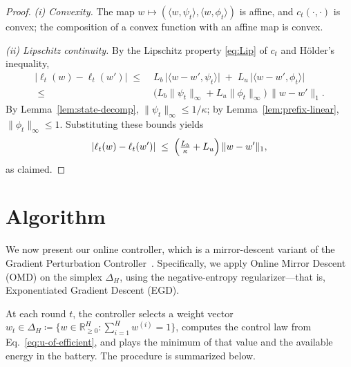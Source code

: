 \begin{proof}
\emph{(i) Convexity.}
The map \(w \mapsto (\langle w,\psi_t\rangle,\langle w,\phi_t\rangle)\) is affine, and \(c_t(\cdot,\cdot)\) is convex; the composition of a convex function with an affine map is convex.

\emph{(ii) Lipschitz continuity.}
By the Lipschitz property \eqref{eq:Lip} of \(c_t\) and Hölder’s inequality,
\begin{align*}
|\ell_t(w)-\ell_t(w')|
\;\le\;&
L_b\,\big|\langle w-w',\psi_t\rangle\big|
\;+\;
L_u\,\big|\langle w-w',\phi_t\rangle\big|
\\\;\le\;&
\bigl(L_b\|\psi_t\|_\infty + L_u\|\phi_t\|_\infty\bigr)\,\|w-w'\|_1.
\end{align*}
By Lemma~\ref{lem:state-decomp}, \(\|\psi_t\|_\infty \le 1/\kappa\); by Lemma~\ref{lem:prefix-linear}, \(\|\phi_t\|_\infty \le 1\). Substituting these bounds yields
\[
|\ell_t(w)-\ell_t(w')|
\;\le\;
\Bigl(\tfrac{L_b}{\kappa} + L_u\Bigr)\,\|w-w'\|_1,
\]
as claimed.
\end{proof}


\section{Algorithm}

We now present our online controller, which is a mirror-descent variant of the Gradient Perturbation Controller~\cite{hazan_introduction_2025}.  
Specifically, we apply Online Mirror Descent (OMD) on the simplex \(\Delta_H\), using the negative-entropy regularizer—that is, Exponentiated Gradient Descent (EGD).

At each round \(t\), the controller selects a weight vector \(w_t \in \Delta_H \coloneqq \{w \in \mathbb{R}^H_{\ge 0} : \sum_{i=1}^H w^{(i)}=1\}\), computes the control law from Eq.~\eqref{eq:u-of-efficient}, and plays the minimum of that value and the available energy in the battery.  
The procedure is summarized below.

